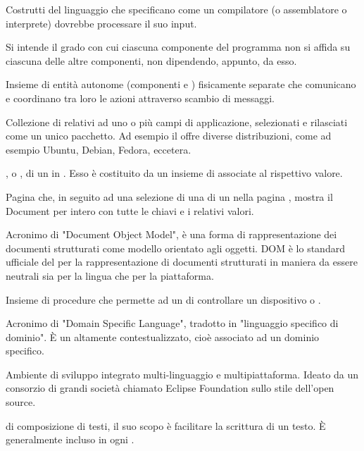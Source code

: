 {Costrutti del linguaggio che specificano come un compilatore (o assemblatore o interprete) dovrebbe processare il suo input.} 

{Si intende il grado con cui ciascuna componente del programma non si affida su ciascuna delle altre componenti, non dipendendo, appunto, da esso.}

{Insieme di entità autonome (componenti  e ) fisicamente separate che comunicano e coordinano tra loro le azioni attraverso scambio di messaggi.}

{Collezione di  relativi ad uno o più campi di applicazione, selezionati e rilasciati come un unico pacchetto. Ad esempio il   offre diverse distribuzioni, come ad esempio Ubuntu, Debian, Fedora, eccetera.}

{, o , di un  in . Esso è costituito da un insieme di  associate al rispettivo valore.}

{Pagina che, in seguito ad una selezione di una  di un  nella pagina , mostra il Document per intero con tutte le chiavi e i relativi valori.}

{Acronimo di "Document Object Model", è una forma di rappresentazione dei documenti strutturati come modello orientato agli oggetti.
DOM è lo standard ufficiale del  per la rappresentazione di documenti strutturati in maniera da essere neutrali sia per la lingua che per la piattaforma.}

{Insieme di procedure che permette ad un  di controllare un dispositivo  o .}

{Acronimo di "Domain Specific Language", tradotto in "linguaggio specifico di dominio". \`{E} un  altamente contestualizzato, cioè associato ad un dominio specifico.} 



{Ambiente di sviluppo integrato multi-linguaggio e multipiattaforma. Ideato da un consorzio di grandi società chiamato Eclipse Foundation sullo stile dell'open source.}

{ di composizione di testi, il suo scopo è facilitare la scrittura di un testo. \`{E} generalmente incluso in ogni .}

